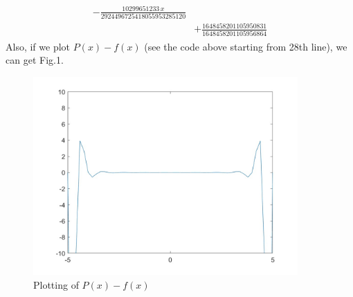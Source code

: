 \documentclass{article}
\begin{document}
\begin{enumerate}
\begin{align}
\begin{split}
            -\frac{10299651233\,x}{2924496725418055953285120}
            \\ & +\frac{1648458201105950831}{1648458201105956864}
        \end{split}
    \end{align}
    Also, if we plot $P(x)-f(x)$ (see the code above starting from 28th line), we can get Fig.1.
    \begin{figure}[h] %
        \includegraphics[width=0.9\textwidth]{assignment_2_4_fig.jpg}
        \centering
        \caption{Plotting of $P(x)-f(x)$}
    \end{figure}

\end{enumerate}
\end{document}
